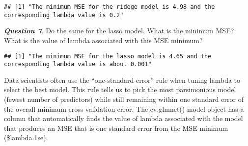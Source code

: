 \documentclass[
]{article}
\newenvironment{Shaded}{\begin{snugshade}}{\end{snugshade}}
\newcommand{\DecValTok}[1]{\textcolor[rgb]{0.00,0.00,0.81}{#1}}
\newcommand{\FloatTok}[1]{\textcolor[rgb]{0.00,0.00,0.81}{#1}}
\newcommand{\FunctionTok}[1]{\textcolor[rgb]{0.00,0.00,0.00}{#1}}
\newcommand{\NormalTok}[1]{#1}
\newcommand{\SpecialCharTok}[1]{\textcolor[rgb]{0.00,0.00,0.00}{#1}}
\newcommand{\StringTok}[1]{\textcolor[rgb]{0.31,0.60,0.02}{#1}}
\begin{document}
\begin{verbatim}
## [1] "The minimum MSE for the ridege model is 4.98 and the corresponding lambda value is 0.2"
\end{verbatim}

\textbf{\emph{Question 7}}. Do the same for the lasso model. What is the
minimum MSE? What is the value of lambda associated with this MSE
minimum?

\begin{Shaded}
\end{Shaded}

\begin{verbatim}
## [1] "The minimum MSE for the lasso model is 4.65 and the corresponding lambda value is about 0.001"
\end{verbatim}

Data scientists often use the ``one-standard-error'' rule when tuning
lambda to select the best model. This rule tells us to pick the most
parsimonious model (fewest number of predictors) while still remaining
within one standard error of the overall minimum cross validation error.
The cv.glmnet() model object has a column that automatically finds the
value of lambda associated with the model that produces an MSE that is
one standard error from the MSE minimum (\$lambda.1se).

\begin{Shaded}
\end{Shaded}
\end{document}
